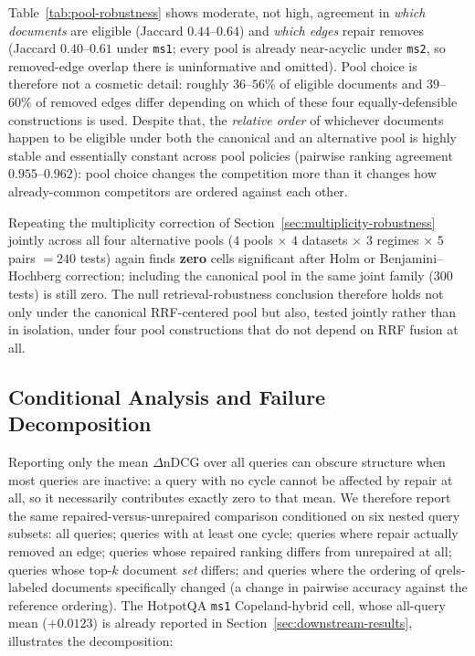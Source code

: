 \documentclass[manuscript,anonymous,review]{acmart}
\begin{document}
Table~\ref{tab:pool-robustness} shows moderate, not high, agreement in
\emph{which documents} are eligible (Jaccard $0.44$--$0.64$) and \emph{which
edges} repair removes (Jaccard $0.40$--$0.61$ under \texttt{ms1}; every pool
is already near-acyclic under \texttt{ms2}, so removed-edge overlap there is
uninformative and omitted). Pool choice is therefore not a cosmetic detail:
roughly $36$--$56\%$ of eligible documents and $39$--$60\%$ of removed edges
differ depending on which of these four equally-defensible constructions is
used. Despite that, the \emph{relative order} of whichever documents happen
to be eligible under both the canonical and an alternative pool is highly
stable and essentially constant across pool policies (pairwise ranking
agreement $0.955$--$0.962$): pool choice changes the competition more than
it changes how already-common competitors are ordered against each other.

Repeating the multiplicity correction of
Section~\ref{sec:multiplicity-robustness} jointly across all four
alternative pools ($4$ pools $\times$ $4$ datasets $\times$ $3$ regimes
$\times$ $5$ pairs $=240$ tests) again finds \textbf{zero} cells significant
after Holm or Benjamini--Hochberg correction; including the canonical pool
in the same joint family ($300$ tests) is still zero. The null
retrieval-robustness conclusion therefore holds not only under the
canonical RRF-centered pool but also, tested jointly rather than in
isolation, under four pool constructions that do not depend on RRF fusion
at all.

\subsection{Conditional Analysis and Failure Decomposition}
\label{sec:conditional-analysis}

Reporting only the mean $\Delta$nDCG over all queries can obscure structure
when most queries are inactive: a query with no cycle cannot be affected by
repair at all, so it necessarily contributes exactly zero to that mean. We
therefore report the same repaired-versus-unrepaired comparison conditioned
on six nested query subsets: all queries; queries with at least one cycle;
queries where repair actually removed an edge; queries whose repaired
ranking differs from unrepaired at all; queries whose top-$k$ document
\emph{set} differs; and queries where the ordering of qrels-labeled
documents specifically changed (a change in pairwise accuracy against the
reference ordering). The HotpotQA \texttt{ms1} Copeland-hybrid cell, whose
all-query mean ($+0.0123$) is already reported in
Section~\ref{sec:downstream-results}, illustrates the decomposition:
\end{document}
